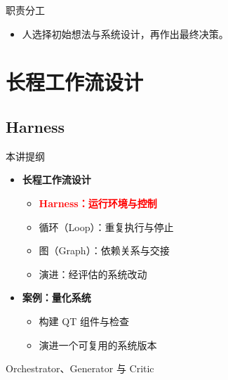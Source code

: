 \begin{frame}{职责分工}
\begin{center}
\resizebox{.96\textwidth}{!}{}
\end{center}
\begin{itemize}
\item 人选择初始想法与系统设计，再作出最终决策。
\end{itemize}
\end{frame}

\section{长程工作流设计}
\subsection{Harness}
\begin{frame}{本讲提纲}
\begin{itemize}
\item \textbf{长程工作流设计}
\begin{itemize}
\item \textcolor{red}{\textbf{Harness：运行环境与控制}}
\item 循环（Loop）：重复执行与停止
\item 图（Graph）：依赖关系与交接
\item 演进：经评估的系统改动
\end{itemize}
\item \textbf{案例：量化系统}
\begin{itemize}
\item 构建 QT 组件与检查
\item 演进一个可复用的系统版本
\end{itemize}
\end{itemize}
\end{frame}

\begin{frame}{Orchestrator、Generator 与 Critic}
\begin{center}
\resizebox{.94\textwidth}{!}{}
\end{center}
\end{frame}

